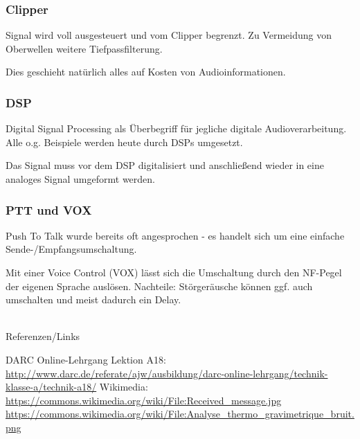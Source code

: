 \begin{frame}
    \frametitle{Clipper}

    Signal wird voll ausgesteuert und vom Clipper begrenzt. Zu Vermeidung von
    Oberwellen weitere Tiefpassfilterung.

    \bigskip

    Dies geschieht natürlich alles auf Kosten von Audioinformationen.

\end{frame}

\begin{frame}
    \frametitle{DSP}

    Digital Signal Processing als Überbegriff für jegliche digitale
    Audioverarbeitung. Alle o.g. Beispiele werden heute durch DSPs umgesetzt.

    \bigskip

    Das Signal muss vor dem DSP digitalisiert und anschließend wieder in eine
    analoges Signal umgeformt werden.

\end{frame}

\begin{frame}
    \frametitle{PTT und VOX}

    Push To Talk wurde bereits oft angesprochen - es handelt sich um eine
    einfache Sende-/Empfangsumschaltung.

    \bigskip

    Mit einer Voice Control (VOX) lässt sich die Umschaltung durch den NF-Pegel
    der eigenen Sprache auslösen. Nachteile: Störgeräusche können ggf. auch
    umschalten und meist dadurch ein Delay.

\end{frame}

\renewcommand{\refname}{Referenzen}

\hypertarget{refs}{}
\textcolor{white}{} \\ %
\Large Referenzen/Links
\footnotesize

\begin{thebibliography}{}
      DARC Online-Lehrgang Lektion A18:
                    \url{http://www.darc.de/referate/ajw/ausbildung/darc-online-lehrgang/technik-klasse-a/technik-a18/}
        Wikimedia:
                    \url{https://commons.wikimedia.org/wiki/File:Received_message.jpg}
                    \url{https://commons.wikimedia.org/wiki/File:Analyse_thermo_gravimetrique_bruit.png}
\end{thebibliography} 


